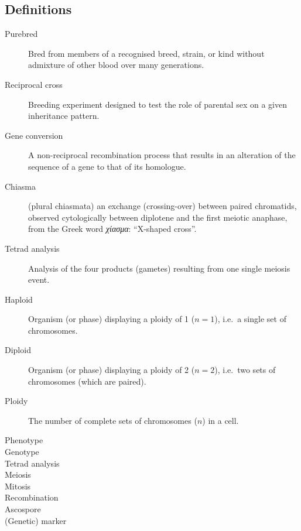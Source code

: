 \begin{alwayssingle}\chapter*{Definitions}
	\thispagestyle{plain}
	\pagestyle{fancy}
	\fancyhead[RO,LE]{\emph{\thepage}}
	\setlength{\baselineskip}{\frontmatterbaselineskip}
	\begin{description}

		\item[Purebred] Bred from members of a recognised breed, strain, or kind without admixture of other blood over many generations.
		\item[Reciprocal cross] Breeding experiment designed to test the role of parental sex on a given inheritance pattern.
		\item[Gene conversion] A non-reciprocal recombination process that results in an alteration of the sequence of a gene to that of its homologue.
	\item[Chiasma] (plural chiasmata) an exchange (crossing-over) between paired chromatids, observed cytologically between diplotene and the first meiotic anaphase, from the Greek word \textit{\textgreek{χίασμα}}: “X-shaped cross”.%
		\item[Tetrad analysis] Analysis of the four products (gametes) resulting from one single meiosis event.
		\item[Haploid] Organism (or phase) displaying a ploidy of 1 ($n=1$), i.e.\ a single set of chromosomes.
		\item[Diploid] Organism (or phase) displaying a ploidy of 2 ($n=2$), i.e.\ two sets of chromosomes (which are paired).
		\item[Ploidy] The number of complete sets of chromosomes ($n$) in a cell. 
		\item[Phenotype]
		\item[Genotype]
		\item[Tetrad analysis]
		\item[Meiosis]
		\item[Mitosis]
		\item[Recombination]
		\item[Ascospore]
		\item[(Genetic) marker] %

\end{description}
\end{alwayssingle}
